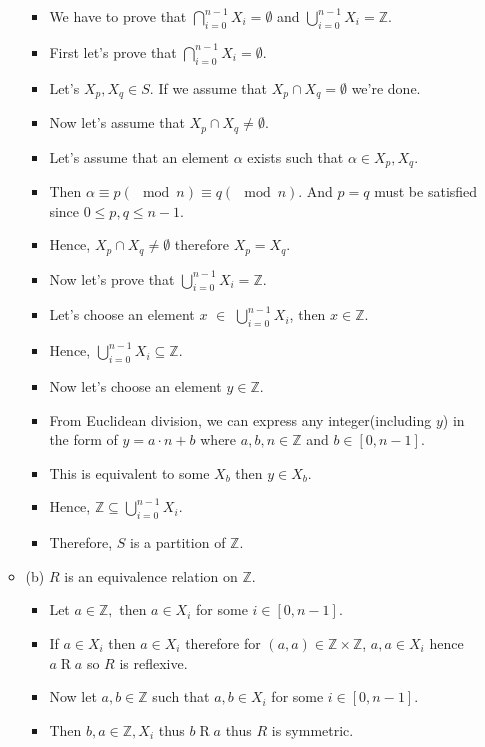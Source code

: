\documentclass[letterpaper,12pt]{article}
\begin{document}
\begin{enumerate}
\begin{itemize}
	\begin{itemize}
	\item We have to prove that $\bigcap_{i=0}^{n-1}X_i = \emptyset$ and $\bigcup_{i=0}^{n-1}X_i=\mathbb{Z}$.
	\item First let's prove that $\bigcap_{i=0}^{n-1}X_i = \emptyset$.
	\item Let's $X_p,X_q \in S$. If we assume that $X_p \cap X_q = \emptyset$ we're done.
	\item Now let's assume that $X_p \cap X_q \neq \emptyset$.
	\item Let's assume that an element $\alpha $ exists such that $\alpha \in X_p,X_q$.
	\item Then $\alpha \equiv p(\mod n) \equiv q(\mod n)$. And $p=q$ must be satisfied since $0 \leq p,q \leq n-1$.
	\item Hence, $X_p \cap X_q \neq \emptyset$ therefore $X_p = X_q$.
	\item Now let's prove that $\bigcup_{i=0}^{n-1}X_i=\mathbb{Z}$.
	\item Let's choose an element $x$ $\in$ $\bigcup_{i=0}^{n-1}X_i$, then $x \in \mathbb{Z}$.
	\item Hence, $\bigcup_{i=0}^{n-1}X_i \subseteq \mathbb{Z}$.
	\item Now let's choose an element $y \in \mathbb{Z}$.
	\item From Euclidean division, we can express any integer(including $y$) in the form of $y = a\cdot n +b$ where $a,b,n \in \mathbb{Z}$ and $ b \in [0,n-1]$.
	\item This is equivalent to some $X_b$ then $y \in X_b$.
	\item Hence, $\mathbb{Z} \subseteq \bigcup_{i=0}^{n-1}X_i $.
	\item Therefore, $S$ is a partition of $\mathbb{Z}$.
	\end{itemize}
	\item (b) $R$ is an equivalence relation on $\mathbb{Z}$.
	\begin{itemize}
	\item Let $a\in \mathbb{Z},$ then $ a\in X_i$ for some $i\in[0,n-1]$.
	\item If $a\in X_i$ then $a\in X_i$ therefore for $(a,a)\in \mathbb{Z} \times \mathbb{Z}$, $a,a \in X_i$ hence $a \mathrel R a$ so $R$ is reflexive.
	\item Now let $a,b \in \mathbb{Z}$ such that $a,b \in X_i$ for some $i \in [0,n-1]$.
	\item Then $b,a \in \mathbb{Z},X_i$ thus $b \mathrel R a$ thus $R$ is symmetric.

\end{itemize}
\end{itemize}
\end{enumerate}
\end{document}
